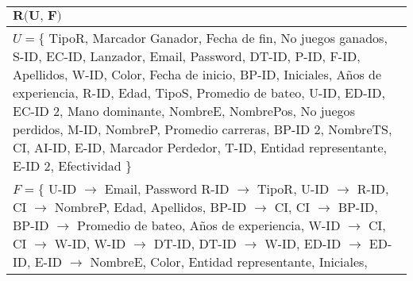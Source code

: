 \documentclass{report}
\begin{document}
    \begin{tabularx}{\textwidth}{|X|}
        \toprule
        \hfil $\textbf{R(U, F)}$ \\
        \midrule
        \vspace*{0.01cm}
        $U = \{ $ TipoR, Marcador Ganador, Fecha de fin, No juegos ganados, S-ID, EC-ID, Lanzador, Email, Password, DT-ID, P-ID, F-ID, Apellidos, W-ID, Color, Fecha de inicio, BP-ID, Iniciales, Años de experiencia, R-ID, Edad, TipoS, Promedio de bateo, U-ID, ED-ID, EC-ID 2, Mano dominante, NombreE, NombrePos, No juegos perdidos, M-ID, NombreP, Promedio carreras, BP-ID 2, NombreTS, CI, AI-ID, E-ID, Marcador Perdedor, T-ID, Entidad representante, E-ID 2, Efectividad $\} $ 
        \vspace*{0.15cm} \\
        \midrule
        \vspace*{0.01cm}
        $F = \{$
        U-ID $\rightarrow$ Email, Password \newline
        \hspace*{0.9cm} R-ID $\rightarrow$ TipoR, \newline
        \hspace*{0.9cm} U-ID $\rightarrow$ R-ID, \newline
        \hspace*{0.9cm} CI $\rightarrow$ NombreP, Edad, Apellidos, \newline
        \hspace*{0.9cm} BP-ID $\rightarrow$ CI, \newline
        \hspace*{0.9cm} CI $\rightarrow$ BP-ID, \newline
        \hspace*{0.9cm} BP-ID $\rightarrow$ Promedio de bateo, Años de experiencia, \newline
        \hspace*{0.9cm} W-ID $\rightarrow$ CI, \newline
        \hspace*{0.9cm} CI $\rightarrow$ W-ID, \newline
        \hspace*{0.9cm} W-ID $\rightarrow$ DT-ID, \newline
        \hspace*{0.9cm} DT-ID $\rightarrow$ W-ID, \newline
        \hspace*{0.9cm} ED-ID $\rightarrow$ ED-ID, \newline
        \hspace*{0.9cm} E-ID $\rightarrow$ NombreE, Color, Entidad representante, Iniciales, \newline

\end{tabularx}
\end{document}
